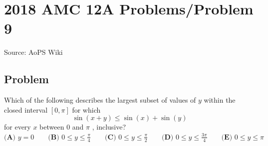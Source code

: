 \documentclass[12pt]{article}
\begin{document}
\section*{{2018 AMC 12A Problems/Problem 9}}
Source: AoPS Wiki

\subsection*{Problem}
Which of the following describes the largest subset of values of $y$ within the closed interval $[0,\pi]$ for which \[\sin(x+y)\leq \sin(x)+\sin(y)\] for every $x$ between $0$ and $\pi$ , inclusive? $\textbf{(A) } y=0 \qquad \textbf{(B) } 0\leq y\leq \frac{\pi}{4} \qquad \textbf{(C) } 0\leq y\leq \frac{\pi}{2} \qquad \textbf{(D) } 0\leq y\leq \frac{3\pi}{4} \qquad \textbf{(E) } 0\leq y\leq \pi$
\end{document}
